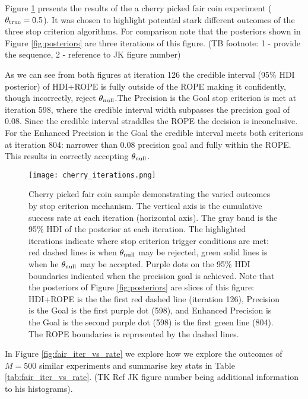 

Figure \ref{fig:iterations} presents the results of the a cherry picked fair coin
experiment ($\theta_{\rm true}=0.5$). It was chosen to highlight potential stark
different outcomes of the three stop criterion algorithms. For comparison note that the posteriors
shown in Figure \ref{fig:posteriors} are three iterations of this figure.
(TB footnote: 1 - provide the sequence, 2 - reference to JK figure number)

As we can see from both figures at iteration 126 the credible interval (95\% HDI posterior) of HDI+ROPE is fully
outside of the ROPE making it confidently, though incorrectly, reject $\theta_{\rm null}$.The Precision is the Goal stop criterion is met at iteration 598, where the credible
interval width
subpasses the precision goal of 0.08. Since the credible interval straddles the ROPE
the decision is inconclusive.
For the Enhanced Precision is the Goal the credible interval
meets both criterions at iteration 804: narrower than 0.08 precision goal and fully within the ROPE.
This results in correctly accepting $\theta_{\rm null}$.


\begin{figure}[h!]
  \centering
  \texttt{[image: cherry\_iterations.png]}
  \caption{Cherry picked fair coin sample demonstrating the varied outcomes by
  stop criterion mechanism. The vertical axis is the cumulative success rate
  at each iteration (horizontal axis).
  The gray band is the 95\% HDI of the posterior at each iteration.
  The highlighted iterations indicate where stop criterion trigger conditions are met:
  red dashed lines is when  $\theta_{\rm null}$ may be rejected, green solid lines
  is when he $\theta_{\rm null}$ may be accepted. Purple dots on the 95\% HDI boundaries
  indicated when the precision goal is achieved. Note that the posteriors of Figure \ref{fig:posteriors}
  are slices of this figure: HDI+ROPE is the the first red dashed line (iteration 126),
  Precision is the Goal is the first purple dot (598), and Enhanced Precision is the Goal is the second purple dot (598)
  is the first green line (804). The ROPE boundaries is represented by the dashed lines.
  }
  \label{fig:iterations}
\end{figure}

In Figure \ref{fig:fair_iter_vs_rate} we explore how we explore the outcomes of $M=500$
similar experiments and summarise key stats in Table \ref{tab:fair_iter_vs_rate}. (TK Ref JK figure number being additional information to his histograms).


